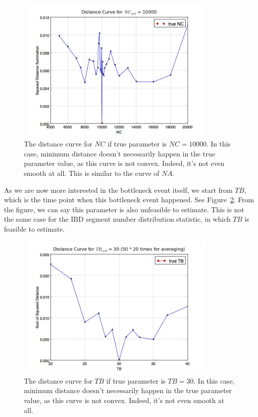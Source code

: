 \documentclass{bioinfo}
\begin{document}
\begin{figure}[h]
\centerline{\includegraphics[width=280pt, height=200pt]{like_NC.jpg}}
\caption{The distance curve for $NC$ if true parameter is $NC=10000$. In this case, minimum distance doesn't necessarily happen in the true parameter value, as this curve is not convex. Indeed, it's not even smooth at all. This is similar to the curve of $NA$.}\label{fig:dis_NC}
\end{figure}

As we are now more interested in the bottleneck event itself, we start from $TB$, which is the time point when this bottleneck event happened. See Figure~\ref{fig:dis_TB}. From the figure, we can say this parameter is also unfeasible to estimate. This is not the same case for the IBD segment number distribution statistic, in which $TB$ is feasible to estimate.

\begin{figure}[h]
\centerline{\includegraphics[width=280pt, height=200pt]{like_TB.jpg}}
\caption{The distance curve for $TB$ if true parameter is $TB=30$. In this case, minimum distance doesn't necessarily happen in the true parameter value, as this curve is not convex. Indeed, it's not even smooth at all.}\label{fig:dis_TB}
\end{figure}
\end{document}
